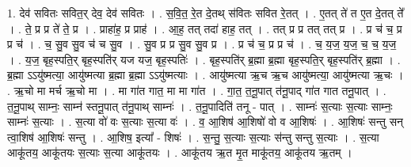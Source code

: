 \documentclass[17pt]{extarticle}
\begin{document}
1. देव॑ सवितः सवित॒र् देव॒ देव॑ सवितः । . स॒वि॒त॒ रे॒त दे॒तथ् स॑वितः सवित रे॒तत् । . ए॒तत् ते॑ त ए॒त दे॒तत् ते᳚ । . ते॒ प्र प्र ते॑ ते॒ प्र । . प्राहा॑ह॒ प्र प्राह॑ । . आ॒ह॒ तत् तदा॑ हाह॒ तत् । . तत् प्र प्र तत् तत् प्र । . प्र च॑ च॒ प्र प्र च॑ । . च॒ सु॒व सु॒व च॑ च सु॒व । . सु॒व प्र प्र सु॒व सु॒व प्र । . प्र च॑ च॒ प्र प्र च॑ । . च॒ य॒ज॒ य॒ज॒ च॒ च॒ य॒ज॒ । . य॒ज॒ बृह॒स्पति॒र् बृह॒स्पति॑र् यज यज॒ बृह॒स्पतिः॑ । . बृह॒स्पति॑र् ब्र॒ह्मा ब्र॒ह्मा बृह॒स्पति॒र् बृह॒स्पति॑र् ब्र॒ह्मा । . ब्र॒ह्मा ऽऽयु॑ष्मत्या॒ आयु॑ष्मत्या ब्र॒ह्मा ब्र॒ह्मा ऽऽयु॑ष्मत्याः । . आयु॑ष्मत्या ऋ॒च ऋ॒च आयु॑ष्मत्या॒ आयु॑ष्मत्या ऋ॒चः । . ऋ॒चो मा मर्च ऋ॒चो मा । . मा गा॑त गात॒ मा मा गा॑त । . गा॒त॒ त॒नू॒पात् त॑नू॒पाद् गा॑त गात तनू॒पात् । . त॒नू॒पाथ् साम्नः॒ साम्न॑ स्तनू॒पात् त॑नू॒पाथ् साम्नः॑ । . त॒नू॒पादिति॑ तनू - पात् । . साम्नः॑ स॒त्याः स॒त्याः साम्नः॒ साम्नः॑ स॒त्याः । . स॒त्या वो॑ वः स॒त्याः स॒त्या वः॑ । . व॒ आ॒शिष॑ आ॒शिषो॑ वो व आ॒शिषः॑ । . आ॒शिषः॑ सन्तु सन् त्वा॒शिष॑ आ॒शिषः॑ सन्तु । . आ॒शिष॒ इत्या᳚ - शिषः॑ । . स॒न्तु॒ स॒त्याः स॒त्याः स॑न्तु सन्तु स॒त्याः । . स॒त्या आकू॑तय॒ आकू॑तयः स॒त्याः स॒त्या आकू॑तयः । . आकू॑तय ऋ॒त मृ॒त माकू॑तय॒ आकू॑तय ऋ॒तम् । \newline
\end{document}
